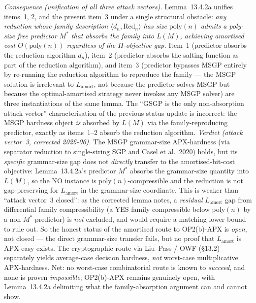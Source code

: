 \documentclass[
]{article}
\begin{document}
\begin{enumerate}
\emph{Consequence (unification of all three attack vectors).}
Lemma~13.4.2a unifies items~1, 2, and the present item~3 under
a single structural obstacle: \emph{any reduction whose family
description $\langle d_n, \mathrm{Red}_n \rangle$ has size
$\mathrm{poly}(n)$ admits a poly-size free predictor $M^*$
that absorbs the family into $L(M)$, achieving amortised cost
$O(\mathrm{poly}(n))$ regardless of the $\Pi$-objective gap.}
Item~1 (predictor absorbs the reduction algorithm $d_n$),
item~2 (predictor absorbs the salting function as part of the
reduction algorithm), and item~3 (predictor bypasses MSGP
entirely by re-running the reduction algorithm to reproduce
the family --- the MSGP solution is irrelevant to
$L_{\mathrm{amort}}$, not because the predictor solves MSGP
but because the optimal-amortised strategy never invokes any
MSGP solver) are three instantiations of the same lemma. The
``GSGP is the only non-absorption attack vector''
characterisation of the previous status update is incorrect:
the MSGP hardness object \emph{is} absorbed by $L(M)$ via the
family-reproducing predictor, exactly as items~1--2 absorb the
reduction algorithm.
\emph{Verdict (attack vector~3, corrected 2026-06).} The MSGP
grammar-size APX-hardness (via separator reduction to
single-string SGP and Casel et al.\ 2020) holds, but its
\emph{specific} grammar-size gap does not \emph{directly} transfer
to the amortised-bit-cost objective: Lemma~13.4.2a's predictor
$M^*$ absorbs the grammar-size quantity into $L(M)$, so the NO
instance is poly$(n)$-compressible and the reduction is not
gap-preserving for $L_{\mathrm{amort}}$ in the grammar-size
coordinate. This is weaker than ``attack vector~3 closed'': as the
corrected lemma notes, a \emph{residual} $L_{\mathrm{amort}}$ gap
from differential family compressibility (a YES family compressible
below poly$(n)$ by a non-$M^*$ predictor) is \emph{not} excluded,
and would require a matching lower bound to rule out. So the honest
status of the amortised route to OP2(b)-APX is \emph{open}, not
closed --- the direct grammar-size transfer fails, but no proof
that $L_{\mathrm{amort}}$ is APX-easy exists. The cryptographic
route via Liu--Pass / OWF (§13.2) separately yields average-case
decision hardness, \emph{not} worst-case multiplicative
APX-hardness. Net: no worst-case combinatorial route is known to
\emph{succeed}, and none is proven \emph{impossible}; OP2(b)-APX
remains genuinely open, with Lemma~13.4.2a delimiting what the
family-absorption argument can and cannot show.
\end{enumerate}
\end{document}
